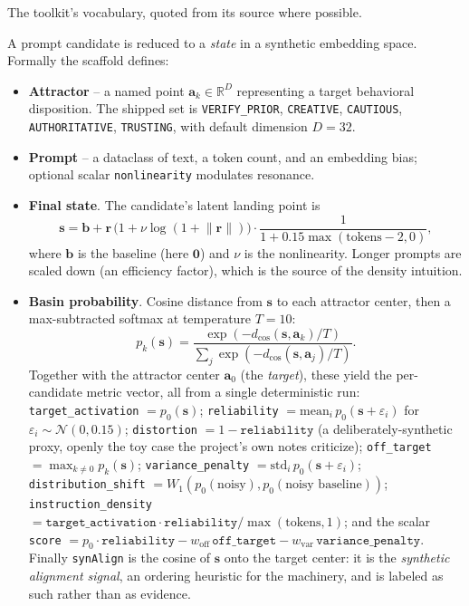 The toolkit's vocabulary, quoted from its source where possible.

A prompt candidate is reduced to a \emph{state} in a synthetic embedding space.
Formally the scaffold defines:

\begin{itemize}[leftmargin=*]
  \item \textbf{Attractor} -- a named point $\mathbf{a}_k \in \mathbb{R}^D$
  representing a target behavioral disposition. The shipped set is
  \texttt{VERIFY\_PRIOR}, \texttt{CREATIVE}, \texttt{CAUTIOUS},
  \texttt{AUTHORITATIVE}, \texttt{TRUSTING}, with default dimension $D=32$.
  \item \textbf{Prompt} -- a dataclass of text, a token count, and an
  embedding bias; optional scalar \texttt{nonlinearity} modulates resonance.
  \item \textbf{Final state}. The candidate's latent landing point is
  \begin{equation}
    \mathbf{s} = \mathbf{b} + \mathbf{r}\,\bigl(1+\nu\log(1+\lVert\mathbf{r}\rVert)\bigr)
    \cdot \frac{1}{1+0.15\max(\text{tokens}-2,0)},
  \end{equation}
  where $\mathbf{b}$ is the baseline (here $\mathbf{0}$) and $\nu$ is the
  nonlinearity. Longer prompts are scaled down (an efficiency factor), which is
  the source of the density intuition.
  \item \textbf{Basin probability}. Cosine distance from $\mathbf{s}$ to each
  attractor center, then a max-subtracted softmax at temperature $T=10$:
  \begin{equation}
    p_k(\mathbf{s}) = \frac{\exp(-d_{\cos}(\mathbf{s},\mathbf{a}_k)/T)}
    {\sum_j \exp(-d_{\cos}(\mathbf{s},\mathbf{a}_j)/T)}.
  \end{equation}
  Together with the attractor center $\mathbf{a}_0$ (the \emph{target}), these
  yield the per-candidate metric vector, all from a single deterministic run:
  \texttt{target\_activation} $=p_0(\mathbf{s})$;
  \texttt{reliability} $=\mathrm{mean}_i\, p_0(\mathbf{s}+\varepsilon_i)$ for
  $\varepsilon_i\sim\mathcal{N}(0,0.15)$;
  \texttt{distortion} $=1-\texttt{reliability}$ (a deliberately-synthetic proxy,
  openly the toy case the project's own notes criticize);
  \texttt{off\_target} $=\max_{k\ne0}p_k(\mathbf{s})$;
  \texttt{variance\_penalty} $=\mathrm{std}_i\,p_0(\mathbf{s}+\varepsilon_i)$;
  \texttt{distribution\_shift} $=W_1(p_0(\text{noisy}),p_0(\text{noisy baseline}))$;
  \texttt{instruction\_density} $=\texttt{target\_activation}\cdot
  \texttt{reliability}/\max(\text{tokens},1)$;
  and the scalar \texttt{score} $=p_0\cdot\texttt{reliability}
  -w_{\text{off}}\,\texttt{off\_target}-w_{\text{var}}\,\texttt{variance\_penalty}$.
  Finally \texttt{synAlign} is the cosine of $\mathbf{s}$ onto the target center:
  it is the \emph{synthetic alignment signal}, an ordering heuristic for the
  machinery, and is labeled as such rather than as evidence.
\end{itemize}

